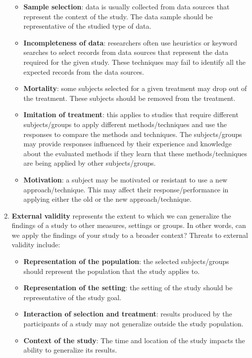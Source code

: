 \begin{enumerate}
\begin{itemize}
        \item \textbf{Sample selection}: data is usually collected from data sources that represent the context of the study. The data sample should be representative of the studied type of data.
        \item \textbf{Incompleteness of data}: researchers often use heuristics or keyword searches to select records from data sources that represent the data required for the given study. These techniques may fail to identify all the expected records from the data sources.
        \item \textbf{Mortality}: some subjects selected for a given treatment may drop out of the treatment. These subjects should be removed from the treatment.
        \item \textbf{Imitation of treatment}: this applies to studies that require different subjects/groups to apply different methods/techniques and use the responses to compare the methods and techniques. The subjects/groups may provide responses influenced by their experience and knowledge about the evaluated methods if they learn that these methods/techniques are being applied by other subjects/groups.
        \item \textbf{Motivation}: a subject may be motivated or resistant to use a new approach/technique. This may affect their response/performance in applying either the old or the new approach/technique.
    \end{itemize}

    \item \textbf{External validity} represents the extent to which we can generalize the findings of a study to other measures, settings or groups. In other words, can we apply the findings of your study to a broader context?
    Threats to external validity include: 
    \begin{itemize}
        \item \textbf{Representation of the population}: the selected subjects/groups should represent the population that the study applies to.
        \item \textbf{Representation of the setting}: the setting of the study should be representative of the study goal.
        \item \textbf{Interaction of selection and treatment}: results produced by the participants of a study may not generalize outside the study population.
        \item \textbf{Context of the study}: The time and location of the study impacts the ability to generalize its results.
    \end{itemize}



\end{enumerate}
